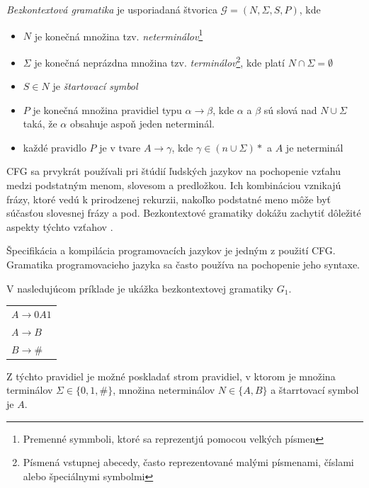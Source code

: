 \begin{definice}
\textit{Bezkontextová gramatika} je usporiadaná štvorica $\mathcal{G} = (N, \Sigma , S, P)$, kde
\begin{itemize}
\item $N$ je konečná množina tzv. \textit{neterminálov}\footnote{Premenné symmboli, ktoré sa reprezentjú pomocou velkých písmen}
\item $\Sigma$ je konečná neprázdna množina tzv. \textit{terminálov}\footnote{Písmená vstupnej abecedy, často reprezentované malými písmenami, číslami alebo špeciálnymi symbolmi}, kde platí $N \cap \Sigma = \emptyset$
\item $S \in N$ je \textit{štartovací symbol}
\item $P$ je konečná množina pravidiel typu $\alpha \rightarrow \beta$, kde $\alpha$ a $\beta$ sú slová nad $N \cup \Sigma$ taká, že $\alpha$ obsahuje aspoň jeden neterminál. 
\item každé pravidlo $P$ je v tvare $A \rightarrow \gamma$, kde $\gamma \in (n \cup \Sigma)*$ a $A$ je neterminál \cite{demlova:gramatiky}
\end{itemize}
\end{definice}

CFG sa prvykrát používali pri štúdií ľudských jazykov na pochopenie vzťahu medzi podstatným menom, slovesom a predložkou. Ich kombináciou vznikajú frázy, ktoré vedú k prirodzenej rekurzii, nakoľko podstatné meno môže byť súčasťou slovesnej frázy a pod. Bezkontextové gramatiky dokážu zachytiť dôležité aspekty týchto vzťahov \cite{computation_theory}.

Špecifikácia a kompilácia programovacích jazykov je jedným z použití CFG. Gramatika programovacieho jazyka sa často používa na pochopenie jeho syntaxe.

V nasledujúcom príklade je ukážka bezkontextovej gramatiky $G_1$.
\begin{center}
\begin{tabular}{p{}}
$A \rightarrow 0A1$\\
$A \rightarrow B$\\
$B \rightarrow $\#
\end{tabular}
\end{center}

Z týchto pravidiel je možné poskladať strom pravidiel, v ktorom je množina terminálov $\Sigma \in \{0,1,\#\}$, množina neterminálov $N \in \{A, B\}$ a štarrtovací symbol je $A$. 

